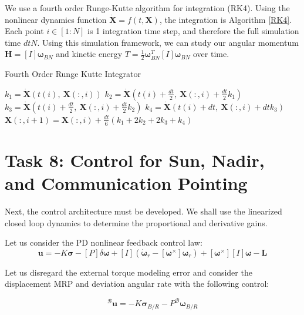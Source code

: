 \documentclass[paper]{aiaaNew}
\begin{document}
We use a fourth order Runge-Kutte algorithm for integration (RK4). Using the nonlinear dynamics function $\dot{\bm{X}} = f(t,\bm{X})$, the integration is Algorithm \ref{RK4}. Each point $i \in [1:N]$ is 1 integration time step, and therefore the full simulation time $dtN$. Using this simulation framework, we can study our angular momentum $\bm{H} = [I]\bm{\omega}_{BN}$ and kinetic energy $T = \frac{1}{2} \bm{\omega}_{BN}^T [I] \bm{\omega}_{BN}$ over time.

\begin{algorithm}
\caption{Fourth Order Runge Kutte Integrator}\label{RK4}
\begin{algorithmic}[1]
    \State $ k_1 = \dot{\bm{X}}(t(i), \ \bm{X}(:,i))$
    \State $ k_2 = \dot{\bm{X}}(t(i)+ \frac{dt}{2}, \  \bm{X}(:,i)+ \frac{dt}{2} k_1)$
    \State $ k_3 = \dot{\bm{X}}(t(i)+ \frac{dt}{2}, \ \bm{X}(:,i)+ \frac{dt}{2} k_2)$
    \State $ k_4 = \dot{\bm{X}}(t(i)+dt,  \ \bm{X}(:,i) + dt k_3)$
    \State $ \bm{X}(:,i+1) =  \bm{X}(:,i) + \frac{dt}{6}(k_1+2k_2+2k_3+k_4)$
\EndFor
\end{algorithmic}
\end{algorithm}








\section*{Task 8: Control for Sun, Nadir, and Communication Pointing}
Next, the control architecture must be developed. We shall use the linearized closed loop dynamics to determine the proportional and derivative gains.

Let us consider the PD nonlinear feedback control law: 
\begin{equation}
  \boldsymbol{u}=-K \boldsymbol{\sigma}-[P] \delta \boldsymbol{\omega}+[I]\left(\dot{\boldsymbol{\omega}}_{r}-[{\boldsymbol{\omega}}^\times] \boldsymbol{\omega}_{r}\right)  +[{\boldsymbol{\omega}}^\times][I] \boldsymbol{\omega}-\boldsymbol{L}
\end{equation}

Let us disregard the external torque modeling error and consider the displacement MRP and deviation angular rate with the following control:

\begin{equation}
  ^\mathcal{B}{\boldsymbol{u}}=-K \boldsymbol{\sigma}_{B / R}-P^{\mathcal{B}} \boldsymbol{\omega}_{B / R}
\end{equation}
\end{document}
